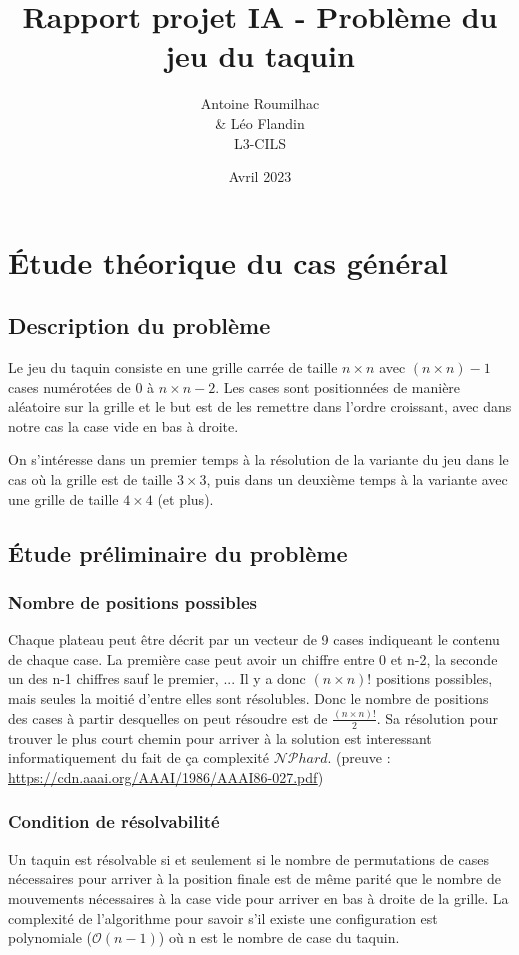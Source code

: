 \documentclass[a4paper, 12pt]{article}
\title{Rapport projet IA - Problème du jeu du taquin}
\author{Antoine Roumilhac\\
    \& Léo Flandin\\
    L3-CILS}
\date{Avril 2023}
\begin{document}
\maketitle

\section{Étude théorique du cas général}

\subsection{Description du problème}
Le jeu du taquin consiste en une grille carrée de taille $n\times n$ avec $(n\times n) - 1$ cases numérotées de 0 à $n \times n - 2$.
Les cases sont positionnées de manière aléatoire sur la grille et le but est de les remettre dans l'ordre croissant, avec dans notre cas la case vide en bas à droite.


On s'intéresse dans un premier temps à la résolution de la variante du jeu dans le cas où la grille est de taille $3 \times 3$, puis dans un deuxième temps à la variante avec une grille de taille $4 \times 4$ (et plus).

\subsection{Étude préliminaire du problème}

\subsubsection{Nombre de positions possibles}
Chaque plateau peut être décrit par un vecteur de 9 cases indiqueant le contenu de chaque case. La première case peut avoir un chiffre entre 0 et n-2, la seconde un des n-1 chiffres sauf le premier, ...
Il y a donc $(n \times n)!$ positions possibles, mais seules la moitié d'entre elles sont résolubles.
Donc le nombre de positions des cases à partir desquelles on peut résoudre est de $\frac{(n\times n)!}{2}$.
Sa résolution pour trouver le plus court chemin pour arriver à la solution est interessant informatiquement du fait de ça complexité $\mathcal{NP}hard$. (preuve : \url{https://cdn.aaai.org/AAAI/1986/AAAI86-027.pdf})
\subsubsection{Condition de résolvabilité}
Un taquin est résolvable si et seulement si le nombre de permutations de cases nécessaires pour arriver à la position finale est de même parité que le nombre de mouvements nécessaires à la case vide pour arriver en bas à droite de la grille.
La complexité de l'algorithme pour savoir s'il existe une configuration est polynomiale ($\mathcal{O}(n-1)$) où n est le nombre de case du taquin.
\end{document}
